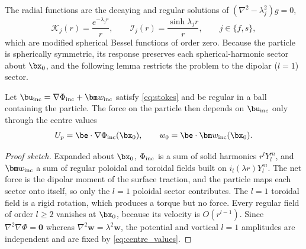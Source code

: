 The radial functions are the decaying and regular solutions of $(\nabla^2-\lambda_j^2)g=0$,
\begin{equation*}
  \mathcal K_j(r)=\frac{e^{-\lambda_j r}}{r},\qquad \mathcal I_j(r)=\frac{\sinh\lambda_j r}{r},\qquad j\in\{f,s\},
\end{equation*}
which are modified spherical Bessel functions of order zero. Because the particle is spherically symmetric, its response
preserves each spherical-harmonic sector about $\bx_0$, and the following lemma restricts the problem to the dipolar
($l=1$) sector.

\begin{lemma}\label{lem:faxen}
Let $\bu_{\rm inc}=\nabla\Phi_{\rm inc}+\bm w_{\rm inc}$ satisfy \cref{eq:stokes} and be regular in a ball containing the
particle. The force on the particle then depends on $\bu_{\rm inc}$ only through the centre values
\begin{equation}
  U_p=\be\cdot\nabla\Phi_{\rm inc}(\bx_0),\qquad w_0=\be\cdot\bm w_{\rm inc}(\bx_0).
  \label{eq:centre_values}
\end{equation}
\end{lemma}
\begin{proof}[Proof sketch]
Expanded about $\bx_0$, $\Phi_{\rm inc}$ is a sum of solid harmonics $r^lY_l^m$, and $\bm w_{\rm inc}$ a sum of regular
poloidal and toroidal fields built on $i_l(\lambda r)Y_l^m$. The net force is the dipolar moment of the surface
traction, and the particle maps each sector onto itself, so only the $l=1$ poloidal sector contributes. The $l=1$
toroidal field is a rigid rotation, which produces a torque but no force. Every regular field of order $l\ge2$ vanishes
at $\bx_0$, because its velocity is $O(r^{l-1})$. Since $\nabla^2\nabla\Phi=\bm 0$ whereas
$\nabla^2\bm w=\lambda^2\bm w$, the potential and vortical $l=1$ amplitudes are independent and are fixed by
\cref{eq:centre_values}.
\end{proof}

